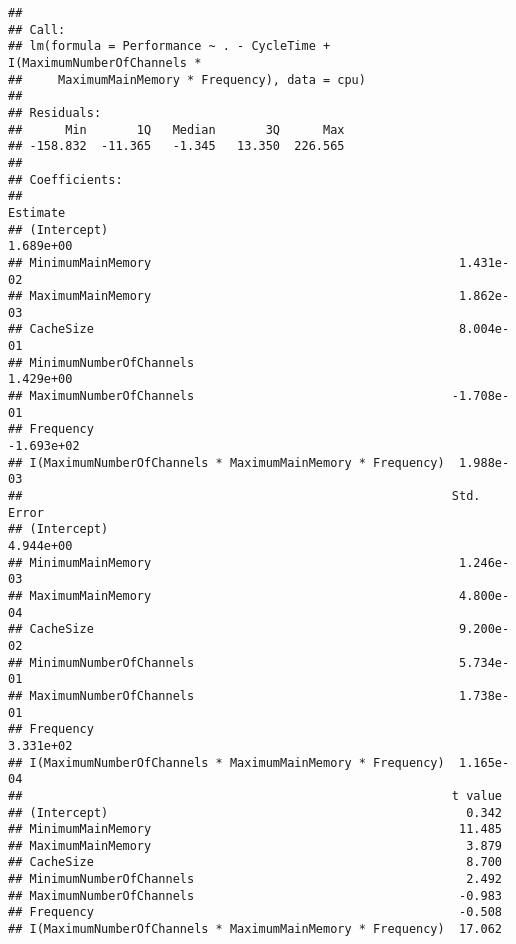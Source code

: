 \documentclass[12pt]{article}
\newenvironment{Shaded}{\begin{snugshade}}{\end{snugshade}}
\newcommand{\KeywordTok}[1]{\textcolor[rgb]{0.13,0.29,0.53}{\textbf{#1}}}
\newcommand{\NormalTok}[1]{#1}
\newcommand{\OperatorTok}[1]{\textcolor[rgb]{0.81,0.36,0.00}{\textbf{#1}}}
\newcommand{\StringTok}[1]{\textcolor[rgb]{0.31,0.60,0.02}{#1}}
\begin{document}
\begin{Shaded}
\end{Shaded}

\begin{verbatim}
## 
## Call:
## lm(formula = Performance ~ . - CycleTime + I(MaximumNumberOfChannels * 
##     MaximumMainMemory * Frequency), data = cpu)
## 
## Residuals:
##      Min       1Q   Median       3Q      Max 
## -158.832  -11.365   -1.345   13.350  226.565 
## 
## Coefficients:
##                                                              Estimate
## (Intercept)                                                 1.689e+00
## MinimumMainMemory                                           1.431e-02
## MaximumMainMemory                                           1.862e-03
## CacheSize                                                   8.004e-01
## MinimumNumberOfChannels                                     1.429e+00
## MaximumNumberOfChannels                                    -1.708e-01
## Frequency                                                  -1.693e+02
## I(MaximumNumberOfChannels * MaximumMainMemory * Frequency)  1.988e-03
##                                                            Std. Error
## (Intercept)                                                 4.944e+00
## MinimumMainMemory                                           1.246e-03
## MaximumMainMemory                                           4.800e-04
## CacheSize                                                   9.200e-02
## MinimumNumberOfChannels                                     5.734e-01
## MaximumNumberOfChannels                                     1.738e-01
## Frequency                                                   3.331e+02
## I(MaximumNumberOfChannels * MaximumMainMemory * Frequency)  1.165e-04
##                                                            t value
## (Intercept)                                                  0.342
## MinimumMainMemory                                           11.485
## MaximumMainMemory                                            3.879
## CacheSize                                                    8.700
## MinimumNumberOfChannels                                      2.492
## MaximumNumberOfChannels                                     -0.983
## Frequency                                                   -0.508
## I(MaximumNumberOfChannels * MaximumMainMemory * Frequency)  17.062

\end{verbatim}
\end{document}

